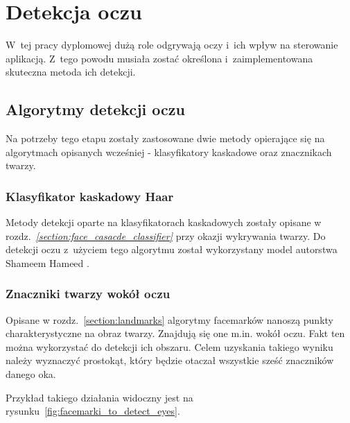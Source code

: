 \newpage

\section{Detekcja oczu} \label{section:eye_detection}

W~tej pracy dyplomowej dużą role odgrywają oczy i~ich wpływ na sterowanie aplikacją. Z~tego powodu musiała zostać określona i~zaimplementowana skuteczna metoda ich detekcji.


\subsection{Algorytmy detekcji oczu}

Na potrzeby tego etapu zostały zastosowane dwie metody opierające się na algorytmach opisanych wcześniej - klasyfikatory kaskadowe oraz znacznikach twarzy.

\subsubsection{Klasyfikator kaskadowy Haar}

Metody detekcji oparte na klasyfikatorach kaskadowych zostały opisane w rozdz.~\hyperref[{section:face_casacde_classifier}]{\textit{\ref{section:face_casacde_classifier}}} przy okazji wykrywania twarzy. Do detekcji oczu z~użyciem tego algorytmu został wykorzystany model autorstwa Shameem Hameed \cite{eye_haar_model}.

\subsubsection{Znaczniki twarzy wokół oczu}

Opisane w rozdz.~\hyperref[section:landmarks]{\ref{section:landmarks}} algorytmy facemarków nanoszą punkty charakterystyczne na obraz twarzy. Znajdują się one m.in. wokół oczu. Fakt ten można wykorzystać do detekcji ich obszaru. Celem uzyskania takiego wyniku należy wyznaczyć prostokąt, który będzie otaczał wszystkie sześć znaczników danego oka. \cite{detect_eye_facemarks}

\par

Przykład takiego działania widoczny jest na rysunku~\ref{fig:facemarki_to_detect_eyes}.

